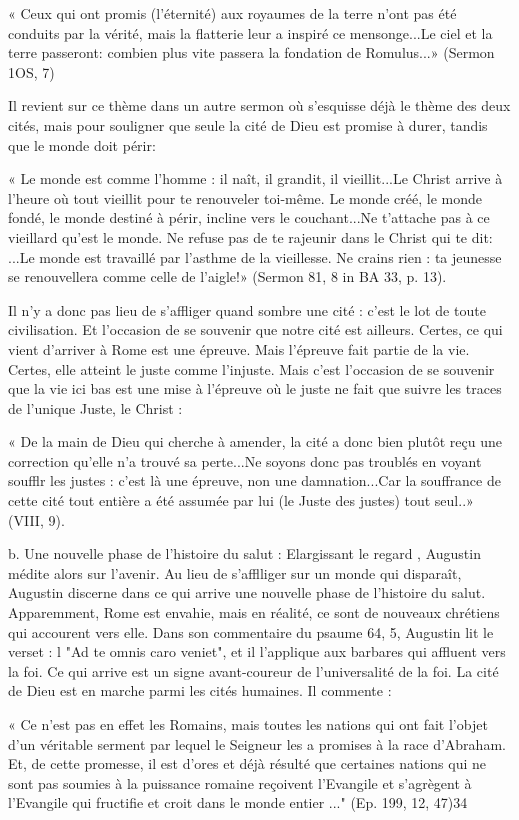 « Ceux qui ont promis (l'éternité) aux royaumes de la terre n'ont pas été conduits par  la vérité, mais la flatterie leur a inspiré ce mensonge...Le ciel et la terre passeront: combien plus vite passera la fondation de Romulus...» (Sermon 1OS, 7)

Il revient sur ce thème dans un autre sermon où s'esquisse déjà le thème des deux cités, mais pour souligner que seule la cité de Dieu est promise à durer, tandis que le monde doit périr:

« Le monde est comme l'homme : il naît, il grandit, il vieillit...Le Christ arrive à l'heure où tout vieillit pour te renouveler toi-même. Le monde créé, le monde fondé, le monde destiné à périr, incline vers le couchant...Ne t'attache pas à ce vieillard qu'est le monde. Ne refuse pas de te rajeunir dans le Christ qui te dit: ...Le monde est travaillé par l'asthme de la vieillesse. Ne crains rien : ta jeunesse se renouvellera comme celle de l'aigle!» (Sermon 81, 8 in BA 33, p. 13).

Il n'y a donc pas lieu de s'affliger quand sombre une cité : c'est le lot de toute civilisation. Et l'occasion de se souvenir que notre cité est ailleurs. Certes, ce qui vient d'arriver à Rome est une épreuve. Mais l'épreuve fait partie de la vie. Certes, elle atteint le juste comme l'injuste. Mais c'est l'occasion de se souvenir que la vie ici­ bas est une mise à l'épreuve où le juste ne fait que suivre les traces de l'unique Juste, le Christ :

« De la main de Dieu qui cherche à amender, la cité a donc bien plutôt reçu une correction qu'elle n'a trouvé sa perte...Ne soyons donc pas troublés en voyant soufflr les justes : c'est là une épreuve, non une damnation...Car la souffrance de cette cité tout entière a été assumée par lui (le Juste des justes) tout seul..» (VIII, 9).

b.	Une nouvelle phase de l'histoire du salut : Elargissant le regard , Augustin médite alors sur l'avenir. Au lieu de s'afflliger sur un monde qui disparaît, Augustin discerne dans ce qui arrive une nouvelle phase de l'histoire du salut. Apparemment, Rome est envahie, mais en réalité, ce sont de nouveaux chrétiens qui
accourent vers elle. Dans son commentaire du psaume 64, 5, Augustin lit le verset : l	"Ad te omnis caro veniet", et il l'applique aux barbares qui affluent vers la foi. Ce qui arrive est un signe avant-coureur de l'universalité de la foi. La cité de Dieu est en
marche parmi les cités humaines. Il commente :

« Ce n'est pas en effet les Romains, mais toutes les nations qui ont fait l'objet d'un véritable serment par lequel le Seigneur les a promises à la race d'Abraham. Et, de cette promesse, il est d'ores et déjà résulté que certaines nations qui ne sont pas soumies à la puissance romaine reçoivent l'Evangile et s'agrègent à l'Evangile qui fructifie et croit dans le monde entier ..." (Ep. 199, 12, 47)34





